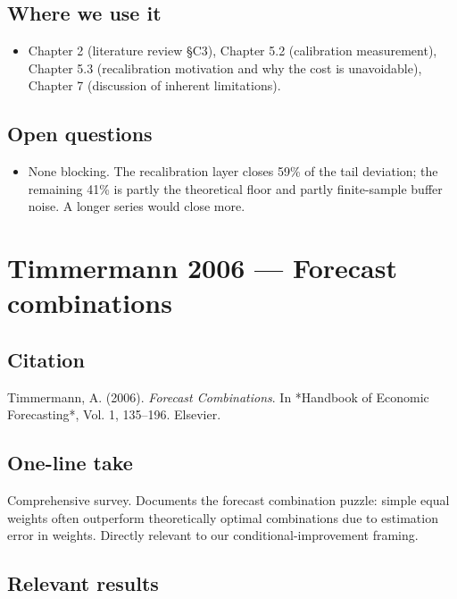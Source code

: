 \documentclass[11pt,a4paper,openany]{report}
\begin{document}
\section{Where we use it}

\begin{itemize}
  \item Chapter 2 (literature review §C3), Chapter 5.2 (calibration
    measurement), Chapter 5.3 (recalibration motivation and why the
    cost is unavoidable), Chapter 7 (discussion of inherent
    limitations).
\end{itemize}

\section{Open questions}

\begin{itemize}
  \item None blocking. The recalibration layer closes 59\% of the tail
    deviation; the remaining 41\% is partly the theoretical floor and
    partly finite-sample buffer noise. A longer series would close more.
\end{itemize}

\chapter{Timmermann 2006 — Forecast combinations}

\section{Citation}

Timmermann, A. (2006). \emph{Forecast Combinations}. In *Handbook of
Economic Forecasting*, Vol. 1, 135–196. Elsevier.

\section{One-line take}

Comprehensive survey. Documents the forecast combination puzzle:
simple equal weights often outperform theoretically optimal
combinations due to estimation error in weights. Directly relevant
to our conditional-improvement framing.

\section{Relevant results}
\end{document}
